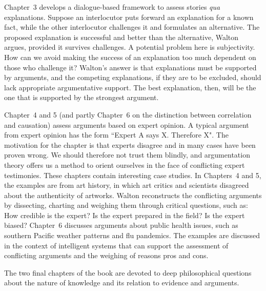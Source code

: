 \documentclass[12pt]{article}
\begin{document}
Chapter~3 develops a dialogue-based framework to assess stories \textit{qua}
explanations. Suppose an interlocutor puts forward an explanation for
a known fact, while the other interlocutor challenges it and
formulates an alternative. The proposed explanation is successful and
better than the alternative, Walton argues, provided it survives
challenges. A potential problem here is subjectivity. How can we avoid
making the success of an explanation too much dependent on those who
challenge it? Walton's answer is that explanations must be supported
by arguments, %
and the competing explanations, if they are to
be excluded, should lack appropriate argumentative support. 
The best explanation, then, will be the one that is 
supported by the strongest argument.

Chapter~4 and 5 (and partly Chapter~6 on the distinction between
correlation and causation) assess arguments based on expert opinion.
A typical argument from
expert opinion has the form ``Expert A says X. Therefore X". The motivation for the chapter is that experts
disagree and in many cases have been proven wrong. We should therefore not
trust them blindly, and argumentation theory offers us a method to
orient ourselves in the face of conflicting expert testimonies. These chapters contain 
interesting case studies. In Chapters~4 and 5, the examples are 
from art history, in which art critics and scientists disagreed about
the authenticity of artworks. Walton reconstructs the conflicting
arguments by dissecting, charting and weighing them through critical
questions, such as: How credible is the expert? Is the expert prepared
in the field? Is the expert biased? Chapter~6 discusses arguments about 
public health issues, such as southern Pacific weather patterns and flu pandemics. The examples are discussed in the context of 
intelligent systems that can support the assessment of
conflicting arguments and the weighing of reasons pros and cons.

The two final chapters of the book are devoted to deep philosophical
questions about the nature of knowledge and its relation to evidence and arguments.
\end{document}
